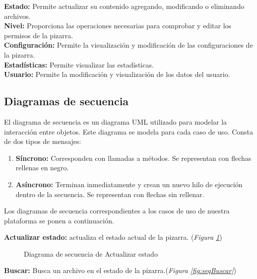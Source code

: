 \textbf{Estado:} Permite actualizar su contenido agregando, modificando o eliminando archivos.\\

\textbf{Nivel: }Proporciona las operaciones necesarias para comprobar y editar los permisos de la pizarra.\\

\textbf{Configuración: }Permite la visualización y modificación de las configuraciones de la pizarra.\\

\textbf{Estadísticas: }Permite visualizar las estadísticas.\\

\textbf{Usuario:} Permite la modificación y visualización de los datos del usuario.

\begin{sidewaysfigure}
\centering
\clases
\caption{Diagrama de clases}
\label{diagramadeclases2}
\end{sidewaysfigure}
\newpage

\subsection{Diagramas de secuencia}

El diagrama de secuencia es un diagrama UML utilizado para modelar la interacción entre objetos. Este diagrama se modela para cada caso de uso. Consta de dos tipos de mensajes:
\begin{enumerate}
	\item \textbf{Síncrono: }Corresponden con llamadas a métodos. Se representan con flechas rellenas en negro.
	\item \textbf{Asíncrono: }Terminan inmediatamente y crean un nuevo hilo de ejecución dentro de la secuencia. Se representan con flechas sin rellenar.
\end{enumerate}

Los diagramas de secuencia correspondientes a los casos de uso de nuestra plataforma se ponen a continuación.

\textbf{Actualizar estado:} actualiza el estado actual de la pizarra. (\emph{Figura \ref{fig:seqActualizarEstado}}) 

\begin{figure}[H]
\centering
\seqActualizarEstado
\caption{Diagrama de secuencia de Actualizar estado}
\label{fig:seqActualizarEstado}
\end{figure}

\textbf{Buscar:} Busca un archivo en el estado de la pizarra.(\emph{Figura \ref{fig:seqBuscar}}) 

